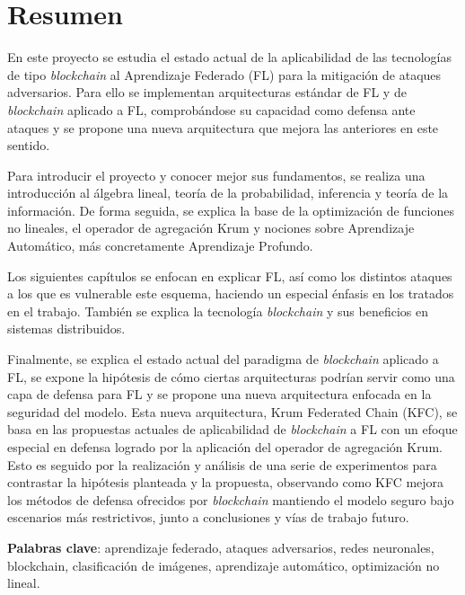 \chapter*{Resumen}

En este proyecto se estudia el estado actual de la aplicabilidad de las tecnologías de tipo \textit{blockchain} al Aprendizaje Federado (FL) para la mitigación de ataques adversarios. Para ello se implementan arquitecturas estándar de FL y de \textit{blockchain} aplicado a FL, comprobándose su capacidad como defensa ante ataques y se propone una nueva arquitectura que mejora las anteriores en este sentido.

Para introducir el proyecto y conocer mejor sus fundamentos, se realiza una introducción al álgebra lineal, teoría de la probabilidad, inferencia y teoría de la información. De forma seguida, se explica la base de la optimización de funciones no lineales, el operador de agregación Krum y nociones sobre Aprendizaje Automático, más concretamente Aprendizaje Profundo.

Los siguientes capítulos se enfocan en explicar FL, así como los distintos ataques a los que es vulnerable este esquema, haciendo un especial énfasis en los tratados en el trabajo. También se explica la tecnología \textit{blockchain} y sus beneficios en sistemas distribuidos.

Finalmente, se explica el estado actual del paradigma de \textit{blockchain} aplicado a FL, se expone la hipótesis de cómo ciertas arquitecturas podrían servir como una capa de defensa para FL y se propone una nueva arquitectura enfocada en la seguridad del modelo. Esta nueva arquitectura, Krum Federated Chain (KFC), se basa en las propuestas actuales de aplicabilidad de \textit{blockchain} a FL con un efoque especial en defensa logrado por la aplicación del operador de agregación Krum. Esto es seguido por la realización y análisis de una serie de experimentos para contrastar la hipótesis planteada y la propuesta, observando como KFC mejora los métodos de defensa ofrecidos por \textit{blockchain} mantiendo el modelo seguro bajo escenarios más restrictivos, junto a conclusiones y vías de trabajo futuro.


\textbf{Palabras clave}: aprendizaje federado, ataques adversarios, redes neuronales, blockchain, clasificación de imágenes, aprendizaje automático, optimización no lineal.